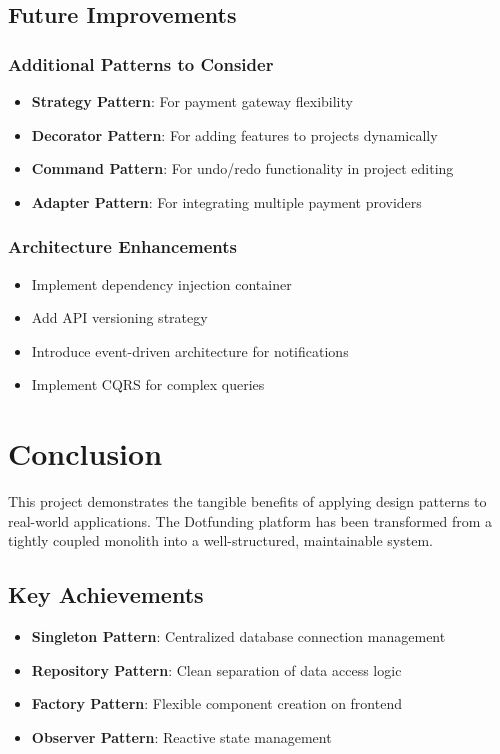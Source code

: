 \documentclass[12pt,a4paper]{article}
\begin{document}
\subsection{Future Improvements}

\subsubsection{Additional Patterns to Consider}
\begin{itemize}
    \item \textbf{Strategy Pattern}: For payment gateway flexibility
    \item \textbf{Decorator Pattern}: For adding features to projects dynamically
    \item \textbf{Command Pattern}: For undo/redo functionality in project editing
    \item \textbf{Adapter Pattern}: For integrating multiple payment providers
\end{itemize}

\subsubsection{Architecture Enhancements}
\begin{itemize}
    \item Implement dependency injection container
    \item Add API versioning strategy
    \item Introduce event-driven architecture for notifications
    \item Implement CQRS for complex queries
\end{itemize}

\newpage

\section{Conclusion}

This project demonstrates the tangible benefits of applying design patterns to real-world applications. The Dotfunding platform has been transformed from a tightly coupled monolith into a well-structured, maintainable system.

\subsection{Key Achievements}
\begin{itemize}
    \item \textbf{Singleton Pattern}: Centralized database connection management
    \item \textbf{Repository Pattern}: Clean separation of data access logic
    \item \textbf{Factory Pattern}: Flexible component creation on frontend
    \item \textbf{Observer Pattern}: Reactive state management
\end{itemize}
\end{document}
